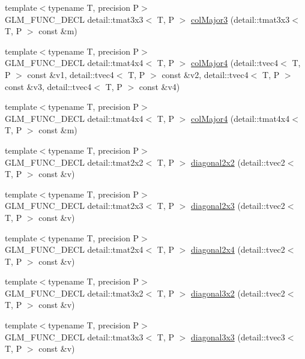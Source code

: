 \begin{CompactItemize}
\item 
{\footnotesize template$<$typename T, precision P$>$ }\\GLM\_\-FUNC\_\-DECL detail::tmat3x3$<$ T, P $>$ \hyperlink{group__gtx__matrix__major__storage_g645e8b3708b02ae2ca1c4f3048f8f32a}{colMajor3} (detail::tmat3x3$<$ T, P $>$ const \&m)
\item 
{\footnotesize template$<$typename T, precision P$>$ }\\GLM\_\-FUNC\_\-DECL detail::tmat4x4$<$ T, P $>$ \hyperlink{group__gtx__matrix__major__storage_g585113d3d54f337093700210a8103f6d}{colMajor4} (detail::tvec4$<$ T, P $>$ const \&v1, detail::tvec4$<$ T, P $>$ const \&v2, detail::tvec4$<$ T, P $>$ const \&v3, detail::tvec4$<$ T, P $>$ const \&v4)
\item 
{\footnotesize template$<$typename T, precision P$>$ }\\GLM\_\-FUNC\_\-DECL detail::tmat4x4$<$ T, P $>$ \hyperlink{group__gtx__matrix__major__storage_g85020709c53f89466c5135114e85d34a}{colMajor4} (detail::tmat4x4$<$ T, P $>$ const \&m)
\item 
{\footnotesize template$<$typename T, precision P$>$ }\\GLM\_\-FUNC\_\-DECL detail::tmat2x2$<$ T, P $>$ \hyperlink{group__gtx__matrix__operation_g8f6e3292b609cd9d959446d808ca3746}{diagonal2x2} (detail::tvec2$<$ T, P $>$ const \&v)
\item 
{\footnotesize template$<$typename T, precision P$>$ }\\GLM\_\-FUNC\_\-DECL detail::tmat2x3$<$ T, P $>$ \hyperlink{group__gtx__matrix__operation_g1d2984ab67cc886c70b1c4993c953d09}{diagonal2x3} (detail::tvec2$<$ T, P $>$ const \&v)
\item 
{\footnotesize template$<$typename T, precision P$>$ }\\GLM\_\-FUNC\_\-DECL detail::tmat2x4$<$ T, P $>$ \hyperlink{group__gtx__matrix__operation_gfba1800a8c3e19da77cb4cd4f1bd72e6}{diagonal2x4} (detail::tvec2$<$ T, P $>$ const \&v)
\item 
{\footnotesize template$<$typename T, precision P$>$ }\\GLM\_\-FUNC\_\-DECL detail::tmat3x2$<$ T, P $>$ \hyperlink{group__gtx__matrix__operation_g91808d304a0220c4e4c68e477ffa2fd2}{diagonal3x2} (detail::tvec2$<$ T, P $>$ const \&v)
\item 
{\footnotesize template$<$typename T, precision P$>$ }\\GLM\_\-FUNC\_\-DECL detail::tmat3x3$<$ T, P $>$ \hyperlink{group__gtx__matrix__operation_g6cc2ba1eff14f0548370fe4df925975c}{diagonal3x3} (detail::tvec3$<$ T, P $>$ const \&v)

\end{CompactItemize}
